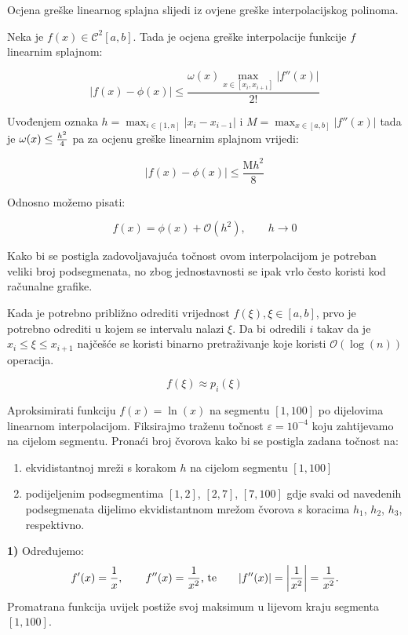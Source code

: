 Ocjena greške linearnog splajna slijedi iz ovjene greške interpolacijskog polinoma.

Neka je $f(x)\in\mathcal{C}^2[a,b]$. Tada je ocjena greške interpolacije funkcije $f$ linearnim splajnom:

$$
|f(x)-\phi(x)| \leq \frac{\omega(x)\max_{x\in[x_i,x_{i+1}]}|f''(x)|}{2!}
$$

Uvođenjem oznaka $h=\max_{i\in[1,n]}|x_i-x_{i-1}|$ i $M=\max_{x\in[a,b]}|f''(x)|$ tada je $\omega(x)\leq{h^2\over4}$ pa za ocjenu greške linearnim splajnom vrijedi:

$$
|f(x) - \phi(x)|\leq \frac{\text{M}h^2}{8}
$$

Odnosno možemo pisati:

\begin{equation*}
    f(x) = \phi(x) + \mathcal{O}(h^2),\qquad h\to0
\end{equation*}

Kako bi se postigla zadovoljavajuća točnost ovom interpolacijom je potreban veliki broj podsegmenata, no zbog jednostavnosti se ipak vrlo često koristi kod računalne grafike.

Kada je potrebno približno odrediti vrijednost $f(\xi), \xi\in[a,b]$, prvo je potrebno odrediti u kojem se intervalu nalazi $\xi$. Da bi odredili $i$ takav da je $x_i\leq\xi\leq x_{i+1}$ najčešće se koristi binarno pretraživanje koje koristi $\mathcal{O}(\log(n))$ operacija.

$$
f(\xi)\approx p_i(\xi)
$$

\newpage

\begin{examplebox}
    Aproksimirati funkciju $f(x) = \ln(x)$ na segmentu $[1,100]$ po dijelovima linearnom interpolacijom. Fiksirajmo traženu točnost $\varepsilon = 10^{-4}$ koju zahtijevamo na cijelom segmentu. Pronaći broj čvorova kako bi se postigla zadana točnost na:

    \begin{enumerate}
        \item ekvidistantnoj mreži s korakom $h$ na cijelom segmentu $[1,100]$
        \item podijeljenim podsegmentima $[1,2]$, $[2,7]$, $[7,100]$ gdje svaki od navedenih podsegmenata dijelimo ekvidistantnom mrežom čvorova s koracima $h_1$, $h_2$, $h_3$, respektivno.
    \end{enumerate}
\end{examplebox}

\textbf{1)} Određujemo:
    $$
    f'(x) = {1\over x},\qquad f''(x)={1\over x^2}\text{, te}\qquad |f''(x)|=\left|{1\over x^2}\right|={1\over x^2}.
    $$
    Promatrana funkcija uvijek postiže svoj maksimum u lijevom kraju segmenta $[1,100]$.

